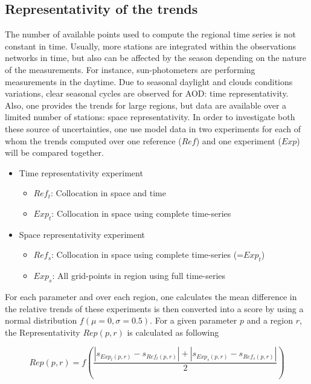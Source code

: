 \documentclass[journal abbreviation, manuscript]{copernicus}
\begin{document}
\subsection{Representativity of the trends}
The number of available points used to compute the regional time series is not constant in time. Usually, more stations are integrated within the observations networks in time, but also can be affected by the season depending on the nature of the measurements. For instance, sun-photometers are performing measurements in the daytime. Due to seasonal daylight and clouds conditions variations, clear seasonal cycles are observed for AOD: time representativity.
Also, one provides the trends for large regions, but data are available over a limited number of stations: space representativity.
In order to investigate both these source of uncertainties, one use model data in two experiments for each of whom the trends computed over one reference ($Ref$) and one experiment ($Exp$) will be compared together.
\begin{itemize}
 \item Time representativity experiment
       \begin{itemize}
        \item $Ref_{t}$: Collocation in space and time
        \item $Exp_{t}$: Collocation in space using complete time-series
       \end{itemize}
 \item Space representativity experiment
       \begin{itemize}
        \item $Ref_{s}$: Collocation in space using complete time-series (=$Exp_{t}$)
        \item $Exp_{s}$: All grid-points in region using full time-series
       \end{itemize}
\end{itemize}

For each parameter and over each region, one calculates the mean difference in the relative trends of these experiments is then converted into a score by using a normal distribution $f(\mu=0, \sigma=0.5)$. For a given parameter $p$ and a region $r$, the Representativity $Rep(p,r)$ is calculated as following

\begin{equation}
 Rep(p, r) = f\left( \frac{\left| s_{Exp_{t}(p, r)}-s_{Ref_{t}(p, r)} \right| + \left| s_{Exp_{s}(p, r)}-s_{Ref_{s}(p, r)}\right| }{2} \right)
\end{equation}
\end{document}
